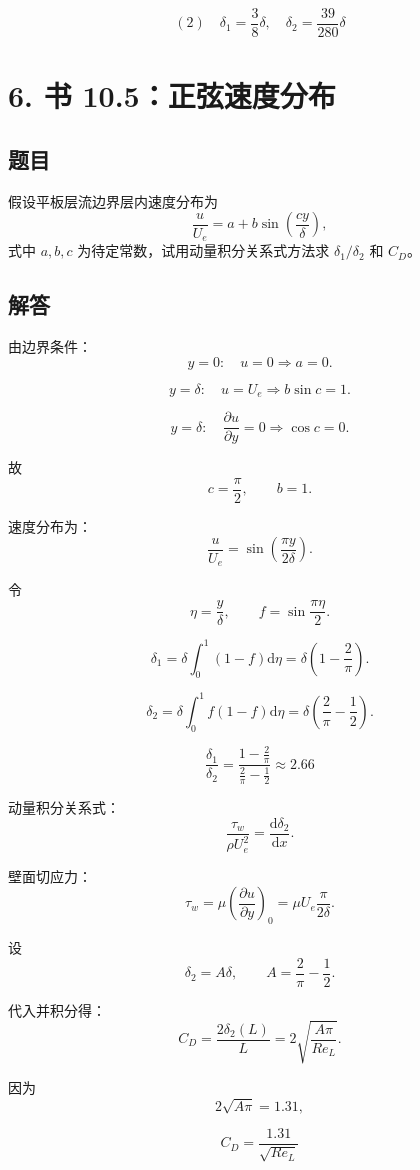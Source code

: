 ﻿\documentclass[11pt,a4paper]{ctexart}
\newcommand{\dd}{\mathrm{d}}
\begin{document}
\[
\boxed{(2)\quad \delta_1=\frac38\delta,\quad \delta_2=\frac{39}{280}\delta}
\]

\section*{6. 书 10.5：正弦速度分布}

\subsection*{题目}

假设平板层流边界层内速度分布为
\[
\frac{u}{U_e}=a+b\sin\left(\frac{cy}{\delta}\right),
\]
式中 \(a,b,c\) 为待定常数，试用动量积分关系式方法求 \(\delta_1/\delta_2\) 和 \(C_D\)。

\subsection*{解答}

由边界条件：
\[
y=0:\quad u=0\Rightarrow a=0.
\]

\[
y=\delta:\quad u=U_e\Rightarrow b\sin c=1.
\]

\[
y=\delta:\quad \frac{\partial u}{\partial y}=0
\Rightarrow \cos c=0.
\]

故
\[
c=\frac{\pi}{2},\qquad b=1.
\]

速度分布为：
\[
\frac{u}{U_e}=\sin\left(\frac{\pi y}{2\delta}\right).
\]

令
\[
\eta=\frac{y}{\delta},\qquad f=\sin\frac{\pi\eta}{2}.
\]

\[
\delta_1=\delta\int_0^1(1-f)\dd\eta
=\delta\left(1-\frac{2}{\pi}\right).
\]

\[
\delta_2=\delta\int_0^1f(1-f)\dd\eta
=\delta\left(\frac{2}{\pi}-\frac12\right).
\]

\[
\boxed{\frac{\delta_1}{\delta_2}
=\frac{1-\frac{2}{\pi}}{\frac{2}{\pi}-\frac12}
\approx2.66}
\]

动量积分关系式：
\[
\frac{\tau_w}{\rho U_e^2}=\frac{\dd\delta_2}{\dd x}.
\]

壁面切应力：
\[
\tau_w=\mu\left(\frac{\partial u}{\partial y}\right)_0
=\mu U_e\frac{\pi}{2\delta}.
\]

设
\[
\delta_2=A\delta,\qquad A=\frac{2}{\pi}-\frac12.
\]

代入并积分得：
\[
C_D=\frac{2\delta_2(L)}{L}
=2\sqrt{\frac{A\pi}{Re_L}}.
\]

因为
\[
2\sqrt{A\pi}=1.31,
\]

\[
\boxed{C_D=\frac{1.31}{\sqrt{Re_L}}}
\]
\end{document}
